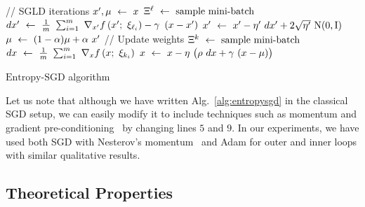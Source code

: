 \documentclass[10pt]{article}
\newcommand{\entropysgd}{\mathrm{Entropy}\textrm{-}\mathrm{SGD}}
\newcommand{\minibatch}[1]{\Xi^{#1}}
\begin{document}
\begin{center}
\begin{minipage}{0.7 \textwidth}
\IncMargin{0.04in}
\begin{algorithm}[H]

    \small
    \vspace{0.1in}
    \nonl \textrm{// SGLD iterations}\;
    \vspace{0.025in}
    $x', \mu \ \leftarrow\  x$\;
    {
        $\minibatch{\ell} \la \textrm{sample mini-batch}$\;
        \vspace{0.03in}
        $dx' \ \leftarrow\  \frac{1}{m}\ \sum_{i=1}^m\ \nabla_{x'} f\left(x';\ \xi_{\ell_i}\right) - \gamma\ \left(x - x'\right)$\;
        \vspace{0.03in}
        $x' \ \leftarrow\  x' - \eta'\ dx' + 2\sqrt{\eta'}\ \mathrm{N}(0, \mathrm{I})$\;
        \vspace{0.03in}
        $\mu \la (1-\a) \mu + \a\ x'$\;
    }
    \vspace{0.1in}
    \nonl \textrm{// Update weights}\;
    \vspace{0.025in}
    $\minibatch{k} \la \textrm{sample mini-batch}$\;
    \vspace{0.03in}
    $dx \ \leftarrow\  \frac{1}{m}\ \sum_{i=1}^m\ \nabla_{x} f\left(x;\ \xi_{k_i}\right)$\;
    \vspace{0.03in}
    $x \ \leftarrow\  x - \eta\ \big(\rho\ dx + \gamma\ (x-\mu) \big)$
    \caption{$\entropysgd$ algorithm}
    \label{alg:entropysgd}
\end{algorithm}
\DecMargin{0.04in}
\end{minipage}
\end{center}

Let us note that although we have written Alg.~\ref{alg:entropysgd} in the classical SGD setup, we can easily modify it to include techniques such as momentum and gradient pre-conditioning~\citep{duchi2011adaptive} by changing lines $5$ and $9$. In our experiments, we have used both SGD with Nesterov's momentum~\citep{sutskever2013importance} and Adam for outer and inner loops with similar qualitative results.

\subsection{Theoretical Properties}
\label{ss:theoretical_properties}
\end{document}
